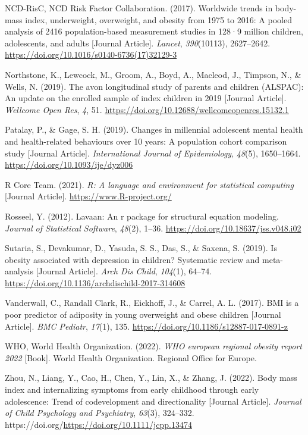 \documentclass[
  letterpaper,
  DIV=11,
  numbers=noendperiod]{scrreport}
\newlength{\cslhangindent}
\newenvironment{CSLReferences}[2] %
 {\begin{list}{}{%
  \setlength{\itemindent}{0pt}
  \setlength{\leftmargin}{0pt}
  \setlength{\parsep}{0pt}
  \ifodd #1
   \setlength{\leftmargin}{\cslhangindent}
   \setlength{\itemindent}{-1\cslhangindent}
  \fi
  \setlength{\itemsep}{#2\baselineskip}}}
 {\end{list}}
\begin{document}
\begin{CSLReferences}{1}{0}
NCD-RisC, NCD Risk Factor Collaboration. (2017). Worldwide trends in
body-mass index, underweight, overweight, and obesity from 1975 to 2016:
A pooled analysis of 2416 population-based measurement studies in 128·9
million children, adolescents, and adults {[}Journal Article{]}.
\emph{Lancet}, \emph{390}(10113), 2627--2642.
\url{https://doi.org/10.1016/s0140-6736(17)32129-3}

Northstone, K., Lewcock, M., Groom, A., Boyd, A., Macleod, J., Timpson,
N., \& Wells, N. (2019). The avon longitudinal study of parents and
children (ALSPAC): An update on the enrolled sample of index children in
2019 {[}Journal Article{]}. \emph{Wellcome Open Res}, \emph{4}, 51.
\url{https://doi.org/10.12688/wellcomeopenres.15132.1}

Patalay, P., \& Gage, S. H. (2019). Changes in millennial adolescent
mental health and health-related behaviours over 10 years: A population
cohort comparison study {[}Journal Article{]}. \emph{International
Journal of Epidemiology}, \emph{48}(5), 1650--1664.
\url{https://doi.org/10.1093/ije/dyz006}

R Core Team. (2021). \emph{R: A language and environment for statistical
computing} {[}Journal Article{]}. \url{https://www.R-project.org/}

Rosseel, Y. (2012). Lavaan: An r package for structural equation
modeling. \emph{Journal of Statistical Software}, \emph{48}(2), 1--36.
\url{https://doi.org/10.18637/jss.v048.i02}

Sutaria, S., Devakumar, D., Yasuda, S. S., Das, S., \& Saxena, S.
(2019). Is obesity associated with depression in children? Systematic
review and meta-analysis {[}Journal Article{]}. \emph{Arch Dis Child},
\emph{104}(1), 64--74.
\url{https://doi.org/10.1136/archdischild-2017-314608}

Vanderwall, C., Randall Clark, R., Eickhoff, J., \& Carrel, A. L.
(2017). BMI is a poor predictor of adiposity in young overweight and
obese children {[}Journal Article{]}. \emph{BMC Pediatr}, \emph{17}(1),
135. \url{https://doi.org/10.1186/s12887-017-0891-z}

WHO, World Health Organization. (2022). \emph{WHO european regional
obesity report 2022} {[}Book{]}. World Health Organization. Regional
Office for Europe.

Zhou, N., Liang, Y., Cao, H., Chen, Y., Lin, X., \& Zhang, J. (2022).
Body mass index and internalizing symptoms from early childhood through
early adolescence: Trend of codevelopment and directionality {[}Journal
Article{]}. \emph{Journal of Child Psychology and Psychiatry},
\emph{63}(3), 324--332.
https://doi.org/\url{https://doi.org/10.1111/jcpp.13474}

\end{CSLReferences}
\end{document}
